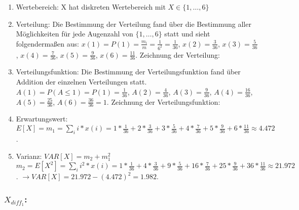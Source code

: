 \documentclass[%
10pt,              %
ngerman,           %
a4paper,           %
DIV11,             %
]{scrartcl}%
\begin{document}
\begin{enumerate}
	\item Wertebereich: X hat diskreten Wertebereich mit $X \in \{1, \dots, 6 \}$
	\item Verteilung: Die Bestimmung der Verteilung fand über die Bestimmung aller Möglichkeiten für jede Augenzahl von $\{1, \dots, 6 \}$ statt und sieht folgendermaßen aus:\newline
	$x(1) = P(1) = \frac{m_i}{m} = \frac{1}{6^2} = \frac{1}{36}$,\newline
	$x(2) = \frac{3}{36}$, $x(3) = \frac{5}{36}$, $x(4) = \frac{7}{36}$, $x(5) = \frac{9}{36}$, $x(6) = \frac{11}{36}$. Zeichnung der Verteilung: 
	
	\item Verteilungsfunktion: Die Bestimmung der Verteilungsfunktion fand über Addition der einzelnen Verteilungen statt.\newline
	$A(1) = P(A \leq 1) = P(1) = \frac{1}{36}$,\newline
	$A(2) = \frac{4}{36}$, $A(3) = \frac{9}{36}$, $A(4) = \frac{16}{36}$, $A(5) = \frac{25}{36}$, $A(6) = \frac{36}{36} = 1$. Zeichnung der Verteilungsfunktion: 
	
	\item Erwartungswert: $E[X] = m_1 = \sum_{i} i * x(i) = 1 * \frac{1}{36} + 2 * \frac{3}{36} + 3 * \frac{5}{36} + 4 * \frac{7}{36} + 5 * \frac{9}{36} + 6 * \frac{11}{36} \approx 4.472$.
	\item Varianz: $VAR[X] = m_2 + m_1^2$\newline
	$m_2 = E[X^2] = \sum_{i} i^2 * x(i) = 1 * \frac{1}{36} + 4 * \frac{3}{36} + 9 * \frac{5}{36} + 16 * \frac{7}{36} + 25 * \frac{9}{36} + 36 * \frac{11}{36} \approx 21.972$.\newline
	$\rightarrow VAR[X] = 21.972 - (4.472)^2 = 1.982$.
\end{enumerate}

\subsubsection*{$X_{diff_1}$:}
\end{document}
